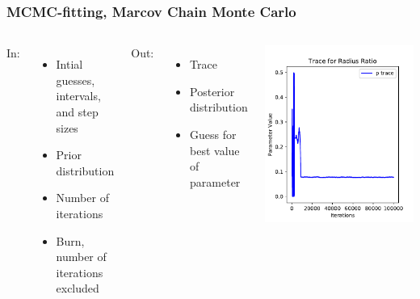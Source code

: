 \documentclass[notes]{beamer}
\begin{document}
\begin{frame}
	\frametitle{MCMC-fitting, Marcov Chain Monte Carlo}
	\begin{columns}
		In:
		\begin{itemize}
			\item Intial guesses, intervals, and step sizes
			\item Prior distribution
			\item Number of iterations
			\item Burn, number of iterations excluded
		\end{itemize}
		
		Out:
		\begin{itemize}
			\item Trace
			\item Posterior distribution
			\item Guess for best value of parameter
		\end{itemize}
		\centering
		\includegraphics[width=\columnwidth]{../figures/Trace_for_radius_Ratio.pdf}
	\end{columns}
	
\end{frame}
\end{document}
